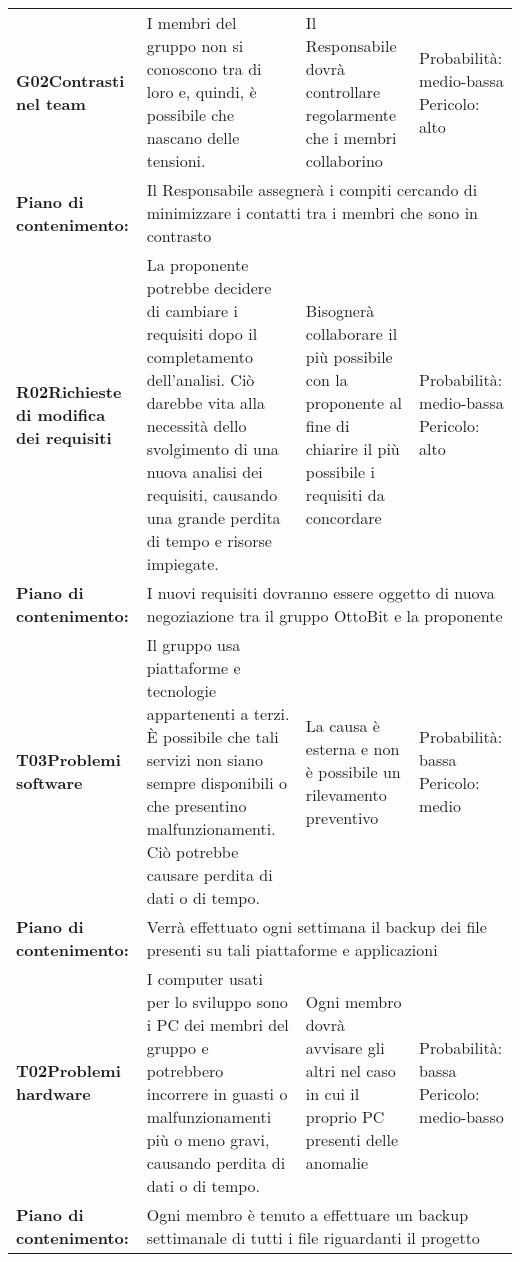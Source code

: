 \begin{longtable}{>{\bfseries}p{2.5cm} p{4.5cm} p{4.5cm} p{2.5cm}}
		\hline
		G02\newline Contrasti nel team
		& I membri del gruppo non si conoscono tra di loro e, quindi, è possibile che nascano delle tensioni. 
		&  Il Responsabile dovrà controllare regolarmente che i membri collaborino
		& Probabilità: medio-bassa \newline Pericolo: alto \\
		\rowcolor{LightGray}
		Piano di contenimento: 
		& \multicolumn{3}{p{12.5cm}}{Il Responsabile assegnerà i compiti cercando di minimizzare i contatti tra i membri che sono in contrasto}\\[0.5cm]

		\hline
		R02\newline Richieste di modifica dei requisiti
		& La proponente potrebbe decidere di cambiare i requisiti dopo il completamento dell'analisi. Ciò darebbe vita alla necessità dello svolgimento di una nuova analisi dei requisiti, causando una grande perdita di tempo e risorse impiegate.
		& Bisognerà collaborare il più possibile con la proponente al fine di chiarire il più possibile i requisiti da concordare
		& Probabilità: medio-bassa \newline Pericolo: alto \\
		\rowcolor{LightGray}
		Piano di contenimento:
		& \multicolumn{3}{p{12.5cm}}{I nuovi requisiti dovranno essere oggetto di nuova negoziazione tra il gruppo OttoBit e la proponente}\\[0.5cm]

		\hline
		T03\newline Problemi software
		& Il gruppo usa piattaforme e tecnologie appartenenti a terzi. \`E possibile che tali servizi non siano sempre disponibili o che presentino malfunzionamenti. Ciò potrebbe causare perdita di dati o di tempo.
		& La causa è esterna e non è possibile un rilevamento preventivo
		& Probabilità: bassa \newline Pericolo: medio \\
		\rowcolor{LightGray}
		Piano di contenimento: 
		& \multicolumn{3}{p{12.5cm}}{Verrà effettuato ogni settimana il backup dei file presenti su tali piattaforme e applicazioni}\\[0.5cm]

		\hline
		T02\newline Problemi hardware
		& I computer usati per lo sviluppo sono i PC dei membri del gruppo e potrebbero incorrere in guasti o malfunzionamenti più o meno gravi, causando perdita di dati o di tempo. 
		& Ogni membro dovrà avvisare gli altri nel caso in cui il proprio PC presenti delle anomalie
		& Probabilità: bassa \newline Pericolo: medio-basso \\
		\rowcolor{LightGray}
		Piano di contenimento: 
		& \multicolumn{3}{p{12.5cm}}{Ogni membro è tenuto a effettuare un backup settimanale di tutti i file riguardanti il progetto}\\[0.5cm]
\end{longtable}